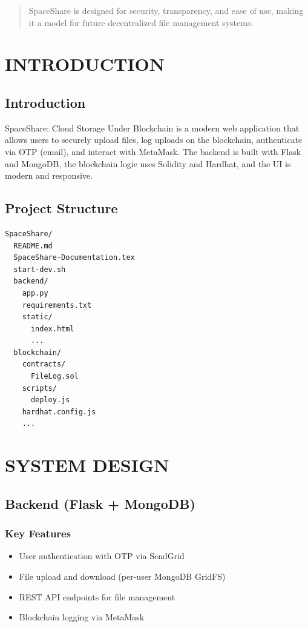 \documentclass[a4paper, 12pt]{report}
\newenvironment{frontmatter}{}{}
\begin{document}
\begin{frontmatter}
\begin{abstract}
SpaceShare is designed for security, transparency, and ease of use, making it a model for future decentralized file management systems.
\end{abstract}
\newpage
{}

\chapter{INTRODUCTION}
\section{Introduction}
SpaceShare: Cloud Storage Under Blockchain is a modern web application that allows users to securely upload files, log uploads on the blockchain, authenticate via OTP (email), and interact with MetaMask. The backend is built with Flask and MongoDB, the blockchain logic uses Solidity and Hardhat, and the UI is modern and responsive.

\section{Project Structure}
\begin{verbatim}
SpaceShare/
  README.md
  SpaceShare-Documentation.tex
  start-dev.sh
  backend/
    app.py
    requirements.txt
    static/
      index.html
      ...
  blockchain/
    contracts/
      FileLog.sol
    scripts/
      deploy.js
    hardhat.config.js
    ...
\end{verbatim}

\chapter{SYSTEM DESIGN}
\section{Backend (Flask + MongoDB)}
\subsection{Key Features}
\begin{itemize}
  \item User authentication with OTP via SendGrid
  \item File upload and download (per-user MongoDB GridFS)
  \item REST API endpoints for file management
  \item Blockchain logging via MetaMask
\end{itemize}


\end{frontmatter}
\end{document}
